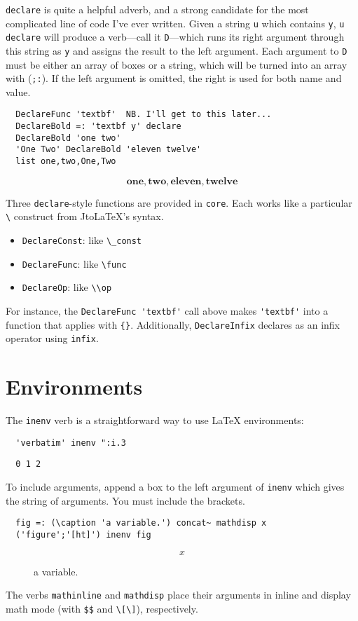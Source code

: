 \documentclass{article}
\begin{document}
\lstinline`declare` is quite a helpful adverb, and a strong candidate for the
most complicated line of code I've ever written. Given a string \lstinline`u`
which contains \lstinline`y`, \lstinline`u declare` will produce a verb---call it
\lstinline`D`---which runs its right argument through this string as \lstinline`y` and
assigns the result to the left argument. Each argument to \lstinline`D` must be
either an array of boxes or a string, which will be turned into an array
with (\lstinline`;:`). If the left argument is omitted, the right is used for both
name and value.
\begin{lstlisting}
  DeclareFunc 'textbf'  NB. I'll get to this later...
  DeclareBold =: 'textbf y' declare
  DeclareBold 'one two'
  'One Two' DeclareBold 'eleven twelve'
  list one,two,One,Two
\end{lstlisting}
\[\textbf{one},\textbf{two},\textbf{eleven},\textbf{twelve}\]

Three \lstinline`declare`-style functions are provided in \lstinline`core`. Each works
like a particular \lstinline`\` construct from JtoLaTeX's syntax.
\begin{itemize}
  \item \lstinline`DeclareConst`: like \lstinline`\_const`
  \item \lstinline`DeclareFunc`: like \lstinline`\func`
  \item \lstinline`DeclareOp`: like \lstinline`\\op`
\end{itemize}
For instance, the \lstinline`DeclareFunc 'textbf'` call above makes \lstinline`'textbf'`
into a function that applies with \lstinline`{}`.
Additionally, \lstinline`DeclareInfix` declares as an infix operator using
\lstinline`infix`.

\section{Environments}
The \lstinline`inenv` verb is a straightforward way to use LaTeX environments:
\begin{lstlisting}
  'verbatim' inenv ":i.3
\end{lstlisting}
\begin{verbatim}
  0 1 2
\end{verbatim}

To include arguments, append a box to the left argument of \lstinline`inenv` which
gives the string of arguments. You must include the brackets.
\begin{lstlisting}
  fig =: (\caption 'a variable.') concat~ mathdisp x
  ('figure';'[ht]') inenv fig
\end{lstlisting}
\begin{figure}[ht]
  \[x\]\caption{a variable.}
\end{figure}


The verbs \lstinline`mathinline` and \lstinline`mathdisp` place their arguments in inline
and display math mode (with \lstinline`$$` and \lstinline`\[\]`), respectively.
\end{document}
